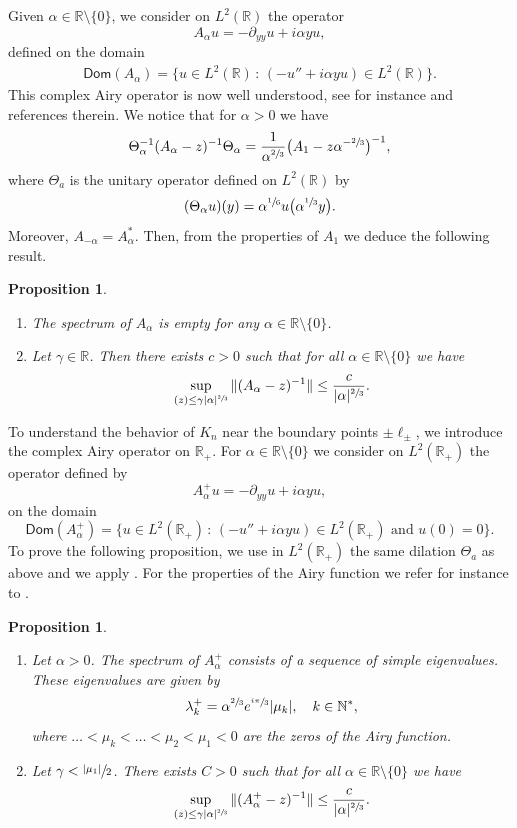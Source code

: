 \documentclass[JEP,XML,SOM,Unicode]{cedram}
\theoremstyle{plain}
\newtheorem{proposition}[theorem]{Proposition}
\theoremstyle{definition}
\newcommand{\abs}[1]{\vert #1\vert}
\newcommand{\nr}[1]{\Vert #1\Vert}
\newcommand{\set}[1]{\{ #1\}}
\newcommand{\bset}[1]{\bigl\{ #1\bigr\}}
\newcommand{\inv}{^{-1}}
\newcommand{\1}{\mathds 1}
\newcommand{\st}{\,:\,}
\let\Re\relax
\DeclareMathOperator{\Re}{\mathsf{Re}\mkern2mu}
\newcommand{\Dom}{\mathsf{Dom}}
\newcommand{\R}{\mathbb{R}}
\newcommand{\N}{\mathbb{N}}
\let\a\alpha
\let\g\gamma
\let\Th\Theta
\let\l\lambda
\let\m\mu
\begin{document}
Given $\a \in \R \setminus \set 0$, we consider on $L^2(\R)$ the operator
\begin{equation} \label{def-Aa}
A_\a u = -\partial_{yy} u + i \a y u,
\end{equation}
defined on the domain
\begin{align*}
\Dom(A_\a) = \set{u \in L^2(\R) \st (-u'' + i \a y u) \in L^2(\R)}.
\end{align*}
This complex Airy operator is now well understood, see for instance \cite{Helffer11,KrejcirikSie15} and references therein. We notice that for $\a > 0$ we have
\[
\Th_\a \inv (A_\a - z)\inv \Th_\a = \frac 1 {\a^{\sfrac 23}} \bigl(A_1 - z \a^{-\sfrac 23} \bigr) \inv,
\]
where $\Th_a$ is the unitary operator defined on $L^2(\R)$ by
\[
(\Th_\a u)(y) = \a^{\sfrac 16} u \bigl(\a^{\sfrac 13} y \bigr).
\]
Moreover, $A_{-\a} = A_\a^*$. Then, from the properties of $A_{1}$ we deduce the following result.

\skpt
\begin{proposition}
\begin{enumerate}
\item The spectrum of $A_\a$ is empty for any $\a \in \R\setminus \set 0$.
\item Let $\gamma \in \R$. Then there exists $c > 0$ such that for all $\a \in \R \setminus \set 0$ we have
\[
\sup_{\Re(z) \leq \g \abs \a^{\sfrac 2 3}} \nr{(A_\a -z)\inv} \leq \frac c {\abs \a^{\sfrac 23}}.
\]
\end{enumerate} \label{prop-Airy-R}
\end{proposition}

To understand the behavior of $K_n$ near the boundary points $\pm \ell_\pm$, we introduce the complex Airy operator on $\R_+$. For $\a \in \R \setminus \set 0$ we consider on $L^2(\R_+)$ the operator defined by
\[
A_\a^+ u = -\partial_{yy} u + i \a y u,
\]
on the domain
\[
\Dom(A_\a^+) = \bset{u \in L^2(\R_+) \st (-u'' + i \a y u) \in L^2(\R_+) \text{ and } u(0) = 0}.
\]
To prove the following proposition, we use in $L^2(\R_+)$ the same dilation $\Th_a$ as above and we apply \cite[Lemma 5.1]{Helffer11}. For the properties of the Airy function we refer for instance to \cite{ValleeSoares}.

\skpt
\begin{proposition}
\begin{enumerate}
\item Let $\a > 0$. The spectrum of $A_\a^+$ consists of a sequence of simple eigenvalues. These eigenvalues are given by
\[
\l_k^+ = \a^{\sfrac 23} e^{\sfrac {i\pi}3} \abs {\m_k}, \quad k \in \N^*,
\]
where $\dots < \mu_k < \dots < \mu_2 < \mu_1 < 0$ are the zeros of the Airy function.
\item Let $\gamma < \sfrac {\abs {\mu_1}} 2$. There exists $C > 0$ such that for all $\a \in \R \setminus \set 0$ we have
\[
\sup_{\Re(z) \leq \g \abs \a^{\sfrac 2 3}} \nr{(A_\a^+ -z)\inv} \leq \frac c {\abs \a^{\sfrac 23}}.
\]
\end{enumerate}\label{prop-Airy-R+}
\end{proposition}
\end{document}
